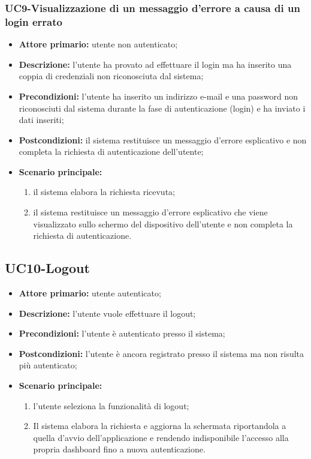 \subsubsection{UC9-Visualizzazione di un messaggio d'errore a causa di un login errato}
\begin{itemize}
	\item \textbf{Attore primario:} utente non autenticato;

	\item \textbf{Descrizione:} l'utente ha provato ad effettuare il login ma ha inserito una coppia di credenziali non riconosciuta dal sistema;

	\item \textbf{Precondizioni:} l'utente ha inserito un indirizzo e-mail e una password non riconosciuti dal sistema durante la fase di autenticazione (login) e ha inviato i dati inseriti;

	\item \textbf{Postcondizioni:} il sistema restituisce un messaggio d'errore esplicativo e non completa la richiesta di autenticazione dell'utente;

	\item \textbf{Scenario principale:} 

	\begin{enumerate}
   		 \item il sistema elabora la richiesta ricevuta;
    	 \item il sistema restituisce un messaggio d'errore esplicativo che viene visualizzato sullo schermo del dispositivo dell'utente e non completa la richiesta di autenticazione.
	\end{enumerate}
\end{itemize}
\subsection{UC10-Logout}
\begin{itemize}
	\item \textbf{Attore primario:} utente autenticato;

	\item \textbf{Descrizione:} l'utente vuole effettuare il logout; 

	\item \textbf{Precondizioni:} l'utente è autenticato presso il sistema;

	\item \textbf{Postcondizioni:} l'utente è ancora registrato presso il sistema ma non risulta più autenticato;

	\item \textbf{Scenario principale:}

	\begin{enumerate}
   		 \item l'utente seleziona la funzionalità di logout;
    	 \item Il sistema elabora la richiesta e aggiorna la schermata riportandola a quella d'avvio dell'applicazione e rendendo indisponibile l'accesso alla propria dashboard fino a nuova autenticazione.
	\end{enumerate}
\end{itemize}
